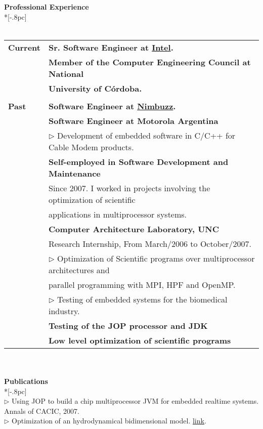 \documentclass[letter,11pt,english]{article}
\begin{document}
{\large \bf Professional Experience}\\*[-.8pc]
\underline{\hspace{6in}}
\\
\\
\begin{tabular}{ p{2cm} l }
  {\bf Current} & {\bf Sr. Software Engineer at \href{http://www.intel.com}{Intel}.}\\ 
                & {\bf Member of the Computer Engineering Council at National} \\
				& {\bf University of C\'ordoba.}\\ \\
  {\bf Past}& 	{\bf Software Engineer at \href{http://www.nimbuzz.com/en/about}{Nimbuzz}.}\\
			& 	{\bf Software Engineer at Motorola Argentina}\\
			& 	$\triangleright$ Development of embedded software in C/C++ for Cable Modem products.\\
			& 	{\bf Self-employed in Software Development and Maintenance}\\
			&	Since 2007. I worked in projects involving the optimization of scientific\\
			&	applications in multiprocessor systems.\\
			& 	{\bf Computer Architecture Laboratory, UNC}\\
			& 	Research Internship, From March/2006 to October/2007.\\
			& 	$\triangleright$ Optimization of Scientific programs over multiprocessor architectures and\\
			& 	parallel programming with MPI, HPF and OpenMP.\\
			& 	$\triangleright$ Testing of embedded systems for the biomedical industry.\\
			& 	{\bf Testing of the JOP processor and JDK}\\
			& 	{\bf Low level optimization of scientific programs}\\
				
\end{tabular}
\\
\\
{\bf Publications} \\*[-.8pc]
\underline{\hspace{6in}} \\
$\triangleright$ Using JOP to build a chip multiprocessor JVM for embedded realtime systems. Annals of CACIC, 2007.\\
$\triangleright$ Optimization of an hydrodynamical bidimensional model. \href{http://www.cimec.org.ar/ojs/index.php/mc/article/viewFile/2930/2867}{link}. \\
\end{document}
